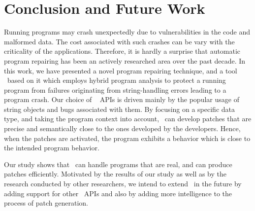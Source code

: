 \section{Conclusion and Future Work}
\label{sec:conc}

Running programs may crash unexpectedly due to vulnerabilities in the code and
malformed data.
The cost associated with such crashes can be vary with the criticality of the
applications. Therefore, it is hardly a surprise that automatic program
repairing has been an actively researched area over the past decade.
In this work, we have presented a novel program repairing technique, and a tool
\tool\ based on it which employs hybrid program analysis to protect a running
program from failures originating from string-handling errors leading to a
program crash.
Our choice of \java\  APIs is driven mainly by the popular usage of
string objects and bugs associated with them.
By focusing on a specific data type, and taking the program context into
account, \tool\ can develop patches that are precise and  semantically close to
the ones developed by the developers.
Hence, when the patches are activated, the program exhibits a behavior which is
close to the intended program behavior.

Our study shows that \tool\ can handle programs that are real, and can produce
patches efficiently. Motivated by the results of our study as well as by the
research conducted by other researchers, we intend to extend \tool\ in the
future by adding support for other \java\ APIs and also by adding more
intelligence to the process of patch generation.
